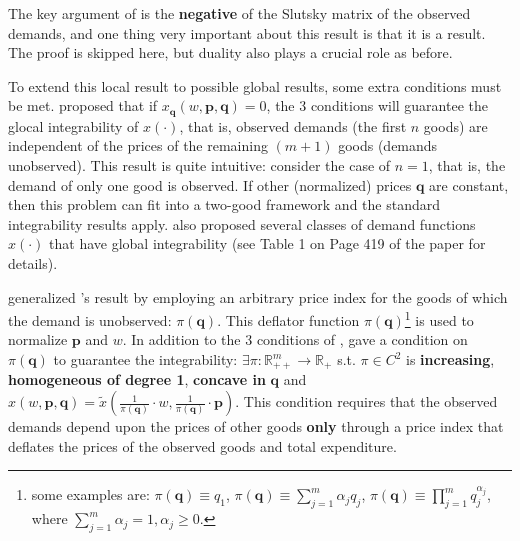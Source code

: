 The key argument of \cite{epstein1982integrability} is the \textbf{negative } of the Slutsky matrix of the observed demands, and one thing very important about this result is that it is a  result. The proof is skipped here, but duality also plays a crucial role as before.

To extend this local result to possible global results, some extra conditions must be met. \citet*{epstein1982integrability} proposed that if $x_{\mathbf{q}}(w,\mathbf{p},\mathbf{q})=0$, the 3 conditions will guarantee the glocal integrability of $x(\cdot)$, that is, observed demands (the first $n$ goods) are independent of the prices of the remaining $(m+1)$ goods (demands unobserved). This result is quite intuitive: consider the case of $n=1$, that is, the demand of only one good is observed. If other (normalized) prices $\mathbf{q}$ are constant, then this problem can fit into a two-good framework and the standard integrability results apply. \citet*{epstein1982integrability} also proposed several classes of demand functions $x(\cdot)$ that have global integrability (see Table 1 on Page 419 of the paper for details).

\citet*{lafrance1989dual} generalized \citeauthor*{epstein1982integrability}'s result by employing an arbitrary price index for the goods of which the demand is unobserved: $\pi(\mathbf{q})$. This deflator function $\pi(\mathbf{q})$\footnote{some examples are: $\pi(\mathbf{q})\equiv q_1$, $\pi(\mathbf{q})\equiv \sum^m_{j=1}\alpha_jq_j$, $\pi(\mathbf{q})\equiv \prod^m_{j=1}q_j^{\alpha_j}$, where $\sum^m_{j=1}\alpha_j=1,\alpha_j\geq 0$.} is used to normalize $\mathbf{p}$ and $w$. In addition to the 3 conditions of \citeauthor*{epstein1982integrability}, \citeauthor*{lafrance1989dual} gave a condition on $\pi(\mathbf{q})$ to guarantee the  integrability: $\exists \pi:\mathbb{R}^m_{++}\rightarrow \mathbb{R}_+$ s.t. $\pi\in C^2$ is \textbf{increasing}, \textbf{homogeneous of degree 1}, \textbf{concave in }$\mathbf{q}$ and $x(w,\mathbf{p},\mathbf{q})=\tilde{x}\left(\frac{1}{\pi(\mathbf{q})}\cdot w,\frac{1}{\pi(\mathbf{q})}\cdot\mathbf{p}\right)$. This condition requires that the observed demands depend upon the prices of other goods \textbf{only} through a price index that deflates the prices of the observed goods and total expenditure. 


